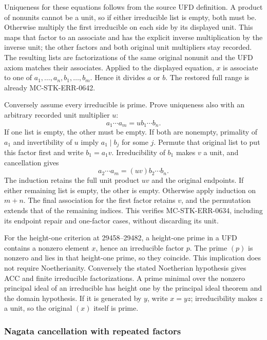 Uniqueness for these equations follows from the source UFD definition. A product of nonunits cannot be a unit, so if either irreducible list is empty, both must be. Otherwise multiply the first irreducible on each side by its displayed unit. This maps that factor to an associate and has the explicit inverse multiplication by the inverse unit; the other factors and both original unit multipliers stay recorded. The resulting lists are factorizations of the same original nonunit and the UFD axiom matches their associates. Applied to the displayed equation, \(x\) is associate to one of \(a_1,\ldots,a_n,b_1,\ldots,b_m\). Hence it divides \(a\) or \(b\). The restored full range is already MC-STK-ERR-0642.

Conversely assume every irreducible is prime. Prove uniqueness also with an arbitrary recorded unit multiplier \(u\): \[
 a_1\cdots a_m=u b_1\cdots b_n.
\] If one list is empty, the other must be empty. If both are nonempty, primality of \(a_1\) and invertibility of \(u\) imply \(a_1\mid b_j\) for some \(j\). Permute that original list to put this factor first and write \(b_1=a_1v\). Irreducibility of \(b_1\) makes \(v\) a unit, and cancellation gives \[
 a_2\cdots a_m=(uv)b_2\cdots b_n.
\] The induction retains the full unit product \(uv\) and the original endpoints. If either remaining list is empty, the other is empty. Otherwise apply induction on \(m+n\). The final association for the first factor retains \(v\), and the permutation extends that of the remaining indices. This verifies MC-STK-ERR-0634, including its endpoint repair and one-factor cases, without discarding its unit.

For the height-one criterion at 29458--29482, a height-one prime in a UFD contains a nonzero element \(x\), hence an irreducible factor \(p\). The prime \((p)\) is nonzero and lies in that height-one prime, so they coincide. This implication does not require Noetherianity. Conversely the stated Noetherian hypothesis gives ACC and finite irreducible factorizations. A prime minimal over the nonzero principal ideal of an irreducible has height one by the principal ideal theorem and the domain hypothesis. If it is generated by \(y\), write \(x=yz\); irreducibility makes \(z\) a unit, so the original \((x)\) itself is prime.

\subsubsection{Nagata cancellation with repeated factors}\label{algebra-proof-029-nagata-cancellation-with-repeated-factors}

